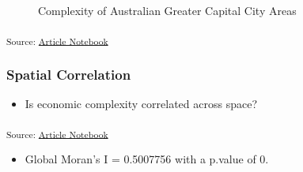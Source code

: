 \documentclass[
  number]{elsarticle}
\providecommand{\tightlist}{%
  \setlength{\itemsep}{0pt}\setlength{\parskip}{0pt}}\usepackage{longtable,booktabs,array}
\begin{document}
\label{cell-fig-gcc-complexity}
\begin{figure}[H]


\caption{\label{fig-gcc-complexity}Complexity of Australian Greater
Capital City Areas}

\end{figure}%

\textsubscript{Source:
\href{https://aiti-flinders.github.io/sirp-complexity/index.qmd.html}{Article
Notebook}}

\subsubsection{Spatial Correlation}\label{spatial-correlation}

\begin{itemize}
\tightlist
\item
  Is economic complexity correlated across space?
\end{itemize}

\textsubscript{Source:
\href{https://aiti-flinders.github.io/sirp-complexity/index.qmd.html}{Article
Notebook}}

\begin{itemize}
\tightlist
\item
  Global Moran's I = 0.5007756 with a p.value of 0.
\end{itemize}
\end{document}
